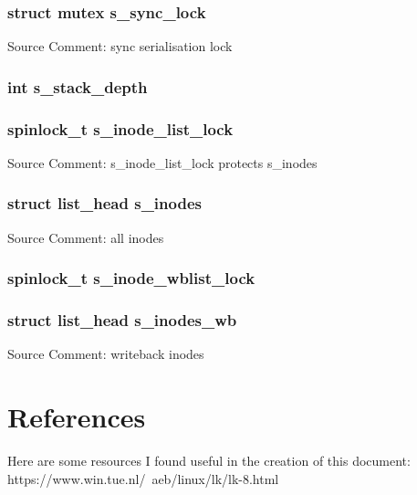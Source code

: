 \documentclass{article}
\newcommand{\sourcecomment}[2][]{Source Comment: #2 \newline #1}
\newcommand{\separator}[0]{\makebox[\textwidth]{\rule{\paperwidth}{0.4pt}}}
\begin{document}
\separator{}

\subsubsection{struct mutex s_sync_lock}
\sourcecomment{sync serialisation lock}

\separator{}

\subsubsection{int s_stack_depth}

\separator{}

\subsubsection{spinlock_t s_inode_list_lock}
\sourcecomment{s_inode_list_lock protects s_inodes}
\subsubsection{struct list_head s_inodes}
\sourcecomment{all inodes}

\separator{}

\subsubsection{spinlock_t s_inode_wblist_lock}
\subsubsection{struct list_head s_inodes_wb}
\sourcecomment{writeback inodes}

\section{References}
Here are some resources I found useful in the creation of this document:
https://www.win.tue.nl/~aeb/linux/lk/lk-8.html
\end{document}
